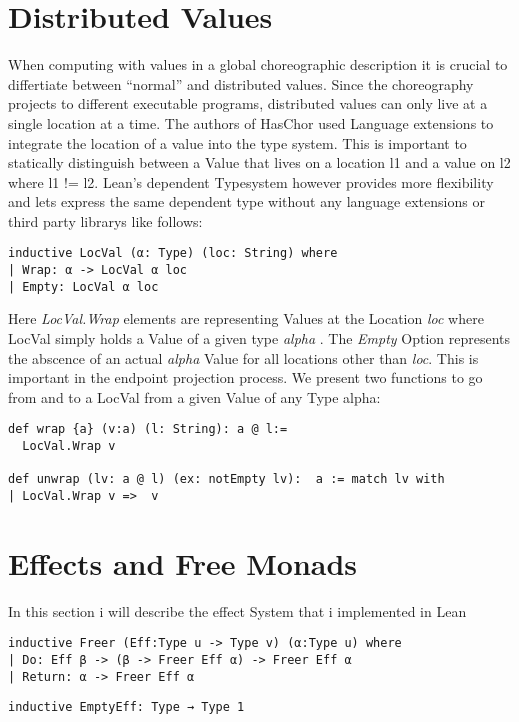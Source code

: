 \section{Distributed Values}
When computing with values in a global choreographic description it is crucial to differtiate between ``normal'' and distributed values. Since the choreography projects to different executable programs, distributed values can only live at a single location at a time. The authors of HasChor used Language extensions to integrate the location of a value into the type system. This is important to statically distinguish between a Value that lives on a location l1 and a value on l2 where l1 != l2.
Lean's dependent Typesystem however provides more flexibility and lets express the same dependent type without any language extensions or third party librarys like follows:
\begin{lstlisting}[language=lean]
inductive LocVal (α: Type) (loc: String) where
| Wrap: α -> LocVal α loc
| Empty: LocVal α loc
\end{lstlisting}
Here \emph{LocVal.Wrap} elements are representing Values at the Location \emph{loc} where LocVal simply holds a Value of a given type \emph{ alpha }.
The \emph{Empty} Option represents the abscence of an actual \emph{alpha} Value for all locations other than \emph{loc}. This is important in the endpoint projection process. We present two functions to go from and to a LocVal from a given Value of any Type alpha:

\begin{lstlisting}[language=lean]
def wrap {a} (v:a) (l: String): a @ l:=
  LocVal.Wrap v

def unwrap (lv: a @ l) (ex: notEmpty lv):  a := match lv with
| LocVal.Wrap v =>  v

\end{lstlisting}

\section{Effects and Free Monads}
In this section i will describe the effect System that i implemented in Lean

\begin{lstlisting}[language=lean]
inductive Freer (Eff:Type u -> Type v) (α:Type u) where
| Do: Eff β -> (β -> Freer Eff α) -> Freer Eff α
| Return: α -> Freer Eff α
\end{lstlisting}


\begin{lstlisting}[language=lean]
inductive EmptyEff: Type → Type 1
\end{lstlisting}

